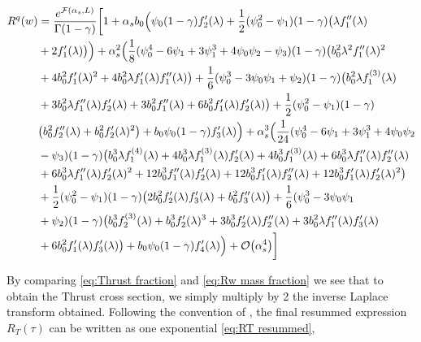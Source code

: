 \documentclass[../main.tex]{subfiles}
\begin{document}
\begin{align}
    \begin{split}\label{eq:Rw final expansion}
        R^q(w) &= \frac{e^{\mathcal{F}(\alpha_s,L)}}{\Gamma(1-\gamma)} \biggl[ 1 + \alpha_s b_0 \Bigl( \psi_0(1-\gamma) f_2'(\lambda )  + \frac{1}{2} (\psi_0^2-\psi_1)(1-\gamma)\bigl( \lambda  f_1''(\lambda ) \\
        &+2  f_1'(\lambda )\bigr)\Bigr) + \alpha_s^2 \Bigl(\frac{1}{8} (\psi_0^4 -6 \psi_1 + 3\psi_1^3 +4\psi_0\psi_2 -\psi_3)(1-\gamma) \bigl(b_0^2 \lambda ^2 f_1''(\lambda )^2\\
        &+4 b_0^2 f_1'(\lambda )^2 +4 b_0^2 \lambda  f_1'(\lambda ) f_1''(\lambda )\bigr)+\frac{1}{6} (\psi_0^3 -3 \psi_0\psi_1+\psi_2)(1-\gamma) \bigl(b_0^2 \lambda  f_1^{(3)}(\lambda )\\
        &+ 3 b_0^2 \lambda  f_1''(\lambda ) f_2'(\lambda )+3 b_0^2 f_1''(\lambda )+6 b_0^2 f_1'(\lambda ) f_2'(\lambda )\bigr)+\frac{1}{2} (\psi_0^2-\psi_1)(1-\gamma) \\
        &\bigl(b_0^2 f_2''(\lambda ) +b_0^2 f_2'(\lambda )^2\bigr) + b_0 \psi_0(1-\gamma) f_3'(\lambda )\Bigr) + \alpha_s^3 \Bigl(\frac{1}{24} (\psi_0^4 -6 \psi_1 + 3\psi_1^3 +4\psi_0\psi_2 \\
        &-\psi_3)(1-\gamma) \bigl(b_0^3 \lambda  f_1^{(4)}(\lambda ) +4 b_0^3 \lambda  f_1^{(3)}(\lambda ) f_2'(\lambda ) + 4 b_0^3 f_1^{(3)}(\lambda )+6 b_0^3 \lambda  f_1''(\lambda ) f_2''(\lambda ) \\
        &+ 6 b_0^3 \lambda  f_1''(\lambda ) f_2'(\lambda )^2 +12 b_0^3 f_1''(\lambda ) f_2'(\lambda )+12 b_0^3 f_1'(\lambda ) f_2''(\lambda ) + 12 b_0^3 f_1'(\lambda ) f_2'(\lambda )^2\bigr) \\
        &+ \frac{1}{2} (\psi_0^2-\psi_1)(1-\gamma) \bigl(2 b_0^2 f_2'(\lambda ) f_3'(\lambda )+b_0^2 f_3''(\lambda )\bigr) + \frac{1}{6} (\psi_0^3 -3 \psi_0\psi_1\\
        &+\psi_2)(1-\gamma) \bigl(b_0^3 f_2^{(3)}(\lambda )+b_0^3 f_2'(\lambda )^3 +3 b_0^3 f_2'(\lambda ) f_2''(\lambda )+3 b_0^2 \lambda  f_1''(\lambda ) f_3'(\lambda ) \\
        &+6 b_0^2 f_1'(\lambda ) f_3'(\lambda )\bigr) + b_0 \psi_0(1-\gamma) f_4'(\lambda ) \Bigr) + \order{\alpha_s^4} \biggr]
    \end{split}
\end{align}

By comparing \cref{eq:Thrust fraction} and \cref{eq:Rw mass fraction} we see that to obtain the Thrust cross section, we simply multiply by 2 the inverse Laplace transform obtained.
Following the convention of \cite{CATANI19933}, the final resummed expression $R_T(\tau)$ can be written as one exponential \cref{eq:RT resummed}, 
\end{document}
